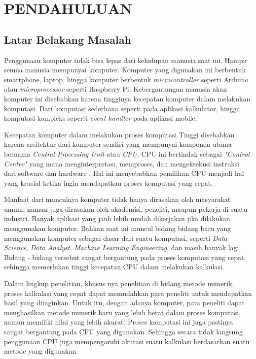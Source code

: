 \chapter{PENDAHULUAN}
\setcounter{page}{1}
\section{Latar Belakang Masalah}
\label{latarbelakang}


Penggunaan komputer tidak bisa lepas dari kehidupan manusia saat ini. Hampir
semua manusia mempunyai komputer. Komputer yang digunakan ini berbentuk smartphone, laptop, hingga
komputer berbentuk \emph{microcontroller} seperti Arduino atau
\emph{microprocessor} seperti Raspberry Pi. Kebergantungan manusia akan
komputer ini disebabkan karena tingginya kecepatan komputer dalam melakukan
komputasi. Dari komputasi sederhana seperti pada aplikasi kalkulator,
hingga komputasi kompleks seperti \emph{event handler} pada aplikasi mobile.


Kecepatan komputer dalam melakukan proses komputasi Tinggi disebabkan karena
arsitektur dari komputer sendiri yang mempunyai komponen utama bernama
\emph{Central Processing Unit} atau \emph{CPU}. CPU ini bertindak sebagai
\emph{"Control Center"} yang mana menginterpretasi, memproses, dan mengeksekusi
instruksi dari software dan hardware \citep{armWhatCentralProcessing2023}. Hal
ini menyebabkan pemilihan CPU menjadi hal yang krusial ketika ingin mendapatkan
proses komputasi yang cepat.


Manfaat dari munculnya komputer tidak hanya dirasakan oleh masyarakat umum,
namun juga dirasakan oleh akademisi, peneliti, maupun pekerja di suatu
industri. Banyak aplikasi yang jauh lebih mudah dikerjakan jika dilakukan
menggunakan komputer. Bahkan saat ini muncul bidang bidang baru yang
menggunakan komputer sebagai dasar dari suatu komputasi, seperti \emph{Data Science},
\emph{Data Analyst}, \emph{Machine Learning Engineering}, dan masih
banyak lagi. Bidang - bidang tersebut sangat bergantung pada proses komputasi
yang cepat, sehingga memerlukan tinggi kecepatan CPU dalam melakukan kalkulasi.

Dalam lingkup penelitian, khusus nya penelitian di bidang metode numerik,
proses kalkulasi yang cepat dapat memudahkan para peneliti untuk mendapatkan
hasil yang diinginkan. Untuk itu, dengan adanya komputer, para peneliti dapat
menghasilkan metode numerik baru yang lebih berat dalam proses komputasi, namun
memiliki nilai yang lebih akurat. Proses komputasi ini juga pastinya sangat
bergantung pada CPU yang digunakan. Sehingga secara tidak langsung penggunaan
CPU juga mempengaruhi akurasi suatu kalkulasi berdasarkan suatu metode yang
digunakan.

